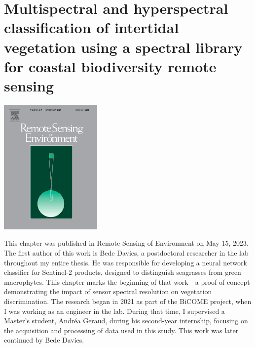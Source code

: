 \documentclass[
  letterpaper,
  11pt,
  english,
  singlespacing,
  headsepline]{MastersDoctoralThesis}
\newcommand{\chaptertopimage}{Chapter1/img/seagrasses.png}
\newcommand{\chapterbottomimage}{Chapter1/img/seagrasses.png}
\begin{document}
\renewcommand{\chaptertopimage}{Chapter2/img/ASD_psd.png}
\renewcommand{\chapterbottomimage}{Chapter2/img/Seagrass_quadrats_psd.png}

\newpage\null\thispagestyle{empty}\newpage


\chapter{Multispectral and hyperspectral classification of intertidal
vegetation using a spectral library for coastal biodiversity remote
sensing}\label{multispectral-and-hyperspectral-classification-of-intertidal-vegetation-using-a-spectral-library-for-coastal-biodiversity-remote-sensing}

\begin{center} 
\includegraphics[width=5cm]{LogoRSE.jpg}
\end{center}

This chapter was published in Remote Sensing of Environment on May 15, 2023. The first author of this work is Bede Davies, a postdoctoral researcher in the lab throughout my entire thesis. He was responsible for developing a neural network classifier for Sentinel-2 products, designed to distinguish seagrasses from green macrophytes. This chapter marks the beginning of that work—a proof of concept demonstrating the impact of sensor spectral resolution on vegetation discrimination.
The research began in 2021 as part of the BiCOME project, when I was working as an engineer in the lab. During that time, I supervised a Master's student, Andréa Geraud, during his second-year internship, focusing on the acquisition and processing of data used in this study. This work was later continued by Bede Davies.

\vspace{0.5cm}
\end{document}
